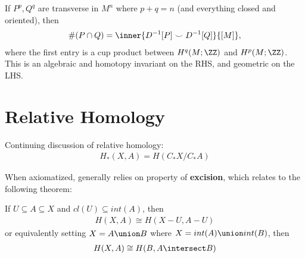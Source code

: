 \begin{theorem}[?]

If \(P^p, Q^q\) are transverse in \(M^n\) where \(p+q=n\) (and
everything closed and oriented), then
\begin{align*}
\#(P \cap Q)= \inner{D^{-1}[P] \smile D^{-1}[Q]}{ [M] }
,\end{align*} where the first entry is a cup product between
\(H^q(M; \ZZ)\) and \(H^p(M; \ZZ)\). This is an algebraic and homotopy
invariant on the RHS, and geometric on the LHS.

\end{theorem}

\hypertarget{relative-homology}{%
\section{Relative Homology}\label{relative-homology}}

Continuing discussion of relative homology:
\begin{align*}
H_*(X,A) = H(C_* X/ C_* A)
\end{align*}

When axiomatized, generally relies on property of \textbf{excision},
which relates to the following theorem:

\begin{theorem}[?]

If \(U \subseteq A \subseteq X\) and \(cl(U) \subseteq int(A)\), then
\begin{align*}
H(X, A) \cong H(X-U, A-U)
\end{align*} or equivalently setting \(X = A \union B\) where
\(X = int(A) \union int(B)\), then
\begin{align*}
H(X,A) \cong H(B, A\intersect B)
\end{align*}

\end{theorem}

